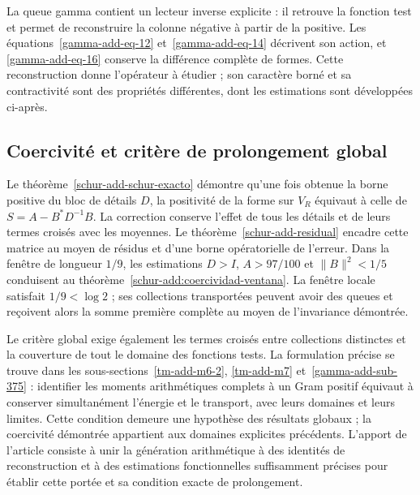 La queue gamma contient un lecteur inverse explicite : il retrouve
la fonction test et permet de reconstruire la colonne négative
à partir de la positive. Les équations~\eqref{gamma-add-eq-12}
et~\eqref{gamma-add-eq-14} décrivent son action, et
\eqref{gamma-add-eq-16} conserve la différence complète de
formes. Cette reconstruction donne l’opérateur à étudier ;
son caractère borné et sa contractivité sont des propriétés différentes,
dont les estimations sont développées ci-après.

\subsection*{Coercivité et critère de prolongement global}

Le théorème~\ref{schur-add-schur-exacto} démontre qu'une fois obtenue la borne positive du bloc de détails $D$, la positivité de la forme sur $V_R$ équivaut à celle de $S=A-B^*D^{-1}B$. La correction conserve l'effet de tous les détails et de leurs termes croisés avec les moyennes. Le théorème~\ref{schur-add-residual} encadre cette matrice au moyen de résidus et d'une borne opératorielle de l'erreur. Dans la fenêtre de longueur $1/9$, les estimations $D>I$, $A>97/100$ et $\|B\|^2<1/5$ conduisent au théorème~\ref{schur-add:coercividad-ventana}. La fenêtre locale satisfait $1/9<\log2$ ; ses collections transportées peuvent avoir des queues et reçoivent alors la somme première complète au moyen de l'invariance démontrée.

Le critère global exige également les termes croisés entre collections distinctes et la couverture de tout le domaine des fonctions tests. La formulation précise se trouve dans les sous-sections~\ref{tm-add-m6-2}, \ref{tm-add-m7} et~\ref{gamma-add-sub-375} : identifier les moments arithmétiques complets à un Gram positif équivaut à conserver simultanément l'énergie et le transport, avec leurs domaines et leurs limites. Cette condition demeure une hypothèse des résultats globaux ; la coercivité démontrée appartient aux domaines explicites précédents. L'apport de l'article consiste à unir la génération arithmétique à des identités de reconstruction et à des estimations fonctionnelles suffisamment précises pour établir cette portée et sa condition exacte de prolongement.
\clearpage
